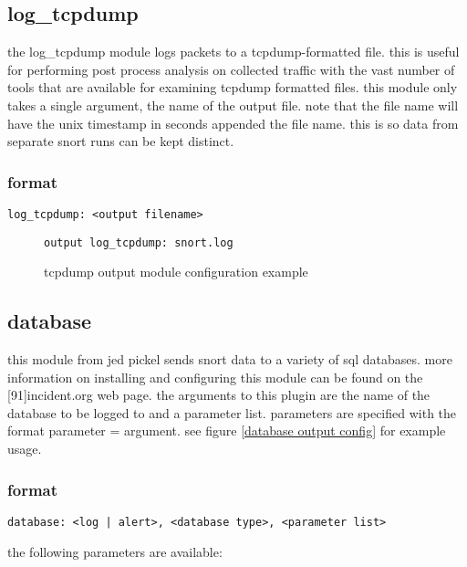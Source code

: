 \documentclass[english]{report}
\begin{document}
\subsection{log\_tcpdump}

the log\_tcpdump module logs packets to a tcpdump-formatted file.
this is useful for performing post process analysis on collected
traffic with the vast number of tools that are available for examining
tcpdump formatted files. this module only takes a single argument, the
name of the output file. note that the file name will have the unix
timestamp in seconds appended the file name. this is so data from
separate snort runs can be kept distinct.


\subsubsection{format}

\begin{verbatim}
log_tcpdump: <output filename>
\end{verbatim}
%
\begin{figure}[!hbpt]
\begin{verbatim}
output log_tcpdump: snort.log
\end{verbatim}

\caption{\label{tcpdump output configuration}tcpdump output module configuration
example}
\end{figure}

\subsection{database \label{database section}}

this module from jed pickel sends snort data to a variety of sql databases.
more information on installing and configuring this module can be
found on the {[}91{]}incident.org web page. the arguments to this
plugin are the name of the database to be logged to and a parameter
list. parameters are specified with the format parameter = argument.
see figure \ref{database output config} for example usage.


\subsubsection{format}

\begin{verbatim}
database: <log | alert>, <database type>, <parameter list>
\end{verbatim}
the following parameters are available:
\end{document}
